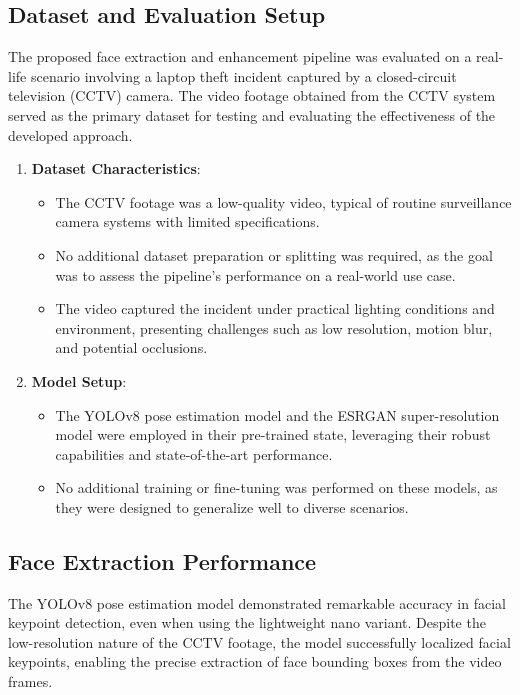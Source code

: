 \subsection{Dataset and Evaluation Setup}

The proposed face extraction and enhancement pipeline was evaluated on a real-life scenario involving a laptop theft incident captured by a closed-circuit television (CCTV) camera. The video footage obtained from the CCTV system served as the primary dataset for testing and evaluating the effectiveness of the developed approach.

\begin{enumerate}
    \item \textbf{Dataset Characteristics}: 

\begin{itemize}
        \item The CCTV footage was a low-quality video, typical of routine surveillance camera systems with limited specifications.
        \item No additional dataset preparation or splitting was required, as the goal was to assess the pipeline's performance on a real-world use case.
        \item The video captured the incident under practical lighting conditions and environment, presenting challenges such as low resolution, motion blur, and potential occlusions.
\end{itemize}

    \item \textbf{Model Setup}: 

\begin{itemize}
        \item The YOLOv8 pose estimation model and the ESRGAN super-resolution model were employed in their pre-trained state, leveraging their robust capabilities and state-of-the-art performance.
        \item No additional training or fine-tuning was performed on these models, as they were designed to generalize well to diverse scenarios.
\end{itemize}

\end{enumerate}

\subsection{Face Extraction Performance}

The YOLOv8 pose estimation model demonstrated remarkable accuracy in facial keypoint detection, even when using the lightweight nano variant. Despite the low-resolution nature of the CCTV footage, the model successfully localized facial keypoints, enabling the precise extraction of face bounding boxes from the video frames.

